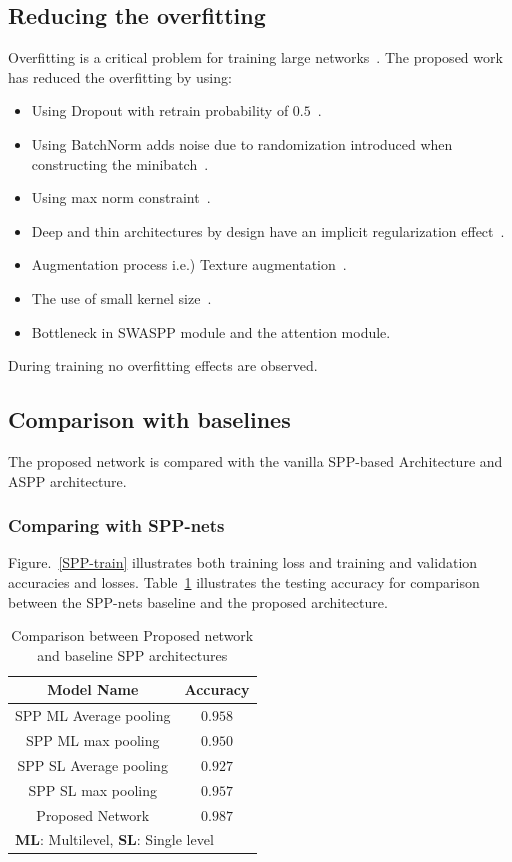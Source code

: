 \subsection{Reducing the overfitting}
Overfitting is a critical problem for training large networks~\cite{krizhevsky2012imagenet}. The proposed work has reduced the overfitting by using:
\begin{itemize}
\item Using Dropout with retrain probability of $0.5$~\cite{srivastava2014dropout}.
\item Using BatchNorm adds noise due to randomization introduced when constructing the minibatch~\cite{ioffe2015batch}.
\item Using max norm constraint~\cite{krizhevsky2012imagenet}.
\item Deep and thin architectures by design have an implicit regularization effect~\cite{he2016deep}. 
\item Augmentation process i.e.) Texture augmentation~\cite{krizhevsky2012imagenet}. 
\item The use of small kernel size~\cite{simonyan2014very}.
\item Bottleneck in SWASPP module and the attention module.
\end{itemize}
During training no overfitting effects are observed.
\subsection{Comparison with baselines}
The proposed network is compared with the vanilla SPP-based Architecture and ASPP architecture.
\subsubsection{Comparing with SPP-nets}
Figure.~\ref{SPP-train} illustrates both training loss and training and validation accuracies and losses. Table~\ref{blaccom} illustrates the testing accuracy for comparison between the SPP-nets baseline and the proposed architecture.
\begin{table}[htbp]
\caption{Comparison between Proposed network and baseline SPP architectures }
\begin{center}
\begin{tabular}{|c|c|}
\hline
\textbf{Model Name}& Accuracy \\
\hline
 SPP ML Average pooling & $0.958$   \\
\hline
SPP ML max pooling & $0.950$   \\
\hline
  SPP SL Average pooling & $0.927$   \\
\hline
  SPP SL max pooling & $0.957$ \\
\hline
Proposed Network & $0.987$\\
\hline
\multicolumn{2}{l}{ \textbf{ML}: Multilevel, \textbf{SL}: Single level}
\end{tabular}
\label{blaccom}
\end{center}
\end{table}

